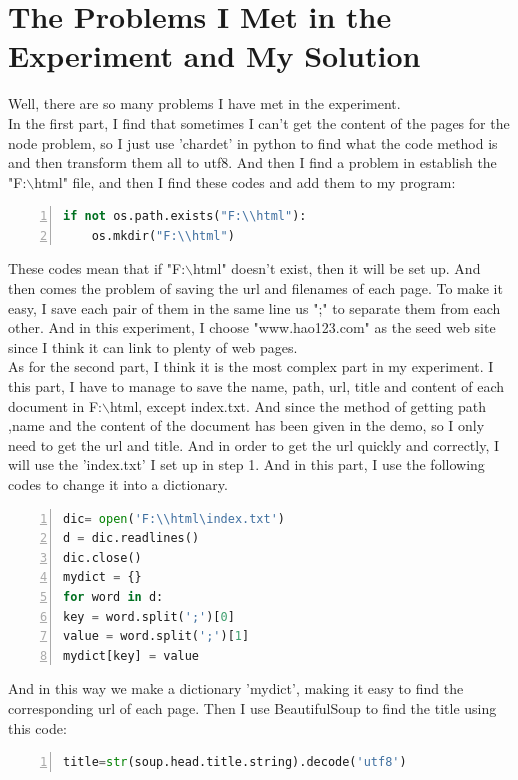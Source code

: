 \documentclass{article}
\begin{document}
\section{The Problems I Met in the Experiment and My Solution}
Well, there are so many problems I have met in the experiment.\\
In the first part, I find that sometimes I can't get the content of the pages for the node problem, so I just use 'chardet' in python to find what the code method is and then transform them all to utf8. And then I find a problem in establish the "F:$\backslash$html" file, and then I find these codes and add them to my program:\\
\begin{lstlisting}[language=python,numbers=left,frame=leftline]
if not os.path.exists("F:\\html"):
    os.mkdir("F:\\html")
\end{lstlisting}
These codes mean that if "F:$\backslash$html" doesn't exist, then it will be set up. And then comes the problem of saving the url and filenames of each page. To make it easy, I save each pair of them in the same line us ";" to separate them from each other. And in this experiment, I choose "www.hao123.com" as the seed web site since I think it can link to plenty of web pages.\\
As for the second part, I think it is the most complex part in my experiment. I this part, I have to manage to save the name, path, url, title and content of each document in F:$\backslash$html, except index.txt. And since the method of getting path ,name and the content of the document has been given in the demo, so I only need to get the url and title. And in order to get the url quickly and correctly, I will use the 'index.txt' I set up in step 1. And in this part, I use the following codes to change it into a dictionary.\\
\begin{lstlisting}[language=python,numbers=left,frame=leftline]
dic= open('F:\\html\index.txt')
d = dic.readlines()
dic.close()
mydict = {}
for word in d:
key = word.split(';')[0]
value = word.split(';')[1]
mydict[key] = value
\end{lstlisting}
And in this way we make a dictionary 'mydict', making it easy to find the corresponding url of each page. Then I use BeautifulSoup to find the title using this code:\\
\begin{lstlisting}[language=python,numbers=left,frame=leftline]
title=str(soup.head.title.string).decode('utf8')
\end{lstlisting}
\end{document}
